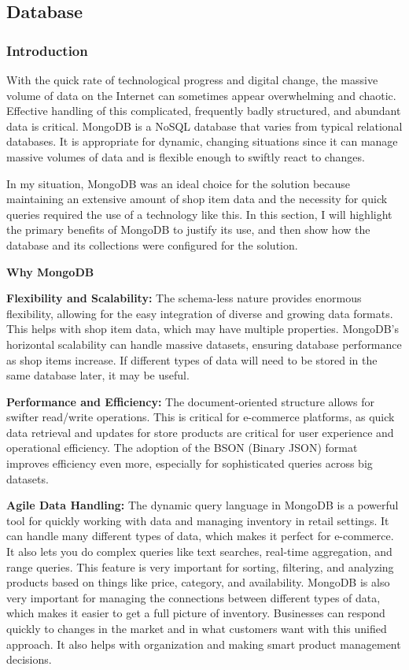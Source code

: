 \subsection{Database}

\subsubsection{Introduction}

With the quick rate of technological progress and digital change, the massive volume of data on the Internet can sometimes appear overwhelming and chaotic. Effective handling of this complicated, frequently badly structured, and abundant data is critical. MongoDB is a NoSQL database that varies from typical relational databases. It is appropriate for dynamic, changing situations since it can manage massive volumes of data and is flexible enough to swiftly react to changes.

In my situation, MongoDB was an ideal choice for the solution because maintaining an extensive amount of shop item data and the necessity for quick queries required the use of a technology like this. In this section, I will highlight the primary benefits of MongoDB to justify its use, and then show how the database and its collections were configured for the solution.

\noindent\textbf{Why MongoDB} 

\textbf{Flexibility and Scalability:} The schema-less nature provides enormous flexibility, allowing for the easy integration of diverse and growing data formats. This helps with shop item data, which may have multiple properties. MongoDB's horizontal scalability can handle massive datasets, ensuring database performance as shop items increase. If different types of data will need to be stored  in the same database later, it may be useful.

\textbf{Performance and Efficiency:} The document-oriented structure allows for swifter read/write operations. This is critical for e-commerce platforms, as quick data retrieval and updates for store products are critical for user experience and operational efficiency. The adoption of the BSON (Binary JSON) format improves efficiency even more, especially for sophisticated queries across big datasets.

\textbf{Agile Data Handling:} The dynamic query language in MongoDB is a powerful tool for quickly working with data and managing inventory in retail settings. It can handle many different types of data, which makes it perfect for e-commerce. It also lets you do complex queries like text searches, real-time aggregation, and range queries. This feature is very important for sorting, filtering, and analyzing products based on things like price, category, and availability. MongoDB is also very important for managing the connections between different types of data, which makes it easier to get a full picture of inventory. Businesses can respond quickly to changes in the market and in what customers want with this unified approach. It also helps with organization and making smart product management decisions. 

